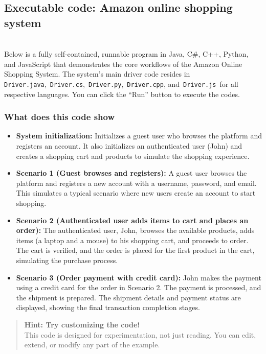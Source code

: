 \subsection{Executable code: Amazon online shopping system}\label{mcg2gLg9H3CiR7Ox5y7Ig}
\\
Below is a fully self-contained, runnable program in Java, C\#, C++, Python, and JavaScript that demonstrates the core workflows of the Amazon Online Shopping System. The system's main driver code resides in \texttt{Driver.java},~\texttt{Driver.cs},~\texttt{Driver.py},~\texttt{Driver.cpp}, and~\texttt{Driver.js}~for all respective languages. You can click the ``Run'' button to execute the codes.

\subsubsection{What does this code show}\label{P3iJfzgPuLN02tbkrblED}

\begin{itemize}
\item
\protect{}\label{FyQrEJX4QaUFdPLcIrze6}
\textbf{System initialization:} Initializes a guest user who browses the platform and registers an account. It also initializes an authenticated user (John) and creates a shopping cart and products to simulate the shopping experience.
\item
\protect{}\label{qPYj-qtTHhvu9YAUSn0vv}
\textbf{Scenario 1 (Guest browses and registers):} A guest user browses the platform and registers a new account with a username, password, and email. This simulates a typical scenario where new users create an account to start shopping.
\item
\protect{}\label{YmFHnOP6p2z1Uvw8965uu}
\textbf{Scenario 2 (Authenticated user adds items to cart and places an order):} The authenticated user, John, browses the available products, adds items (a laptop and a mouse) to his shopping cart, and proceeds to order. The cart is verified, and the order is placed for the first product in the cart, simulating the purchase process.
\item
\protect{}\label{j0VFEwPBoIv-Y4ZpSh8XG}
\textbf{Scenario 3 (Order payment with credit card):} John makes the payment using a credit card for the order in Scenario 2. The payment is processed, and the shipment is prepared. The shipment details and payment status are displayed, showing the final transaction completion stages.
\end{itemize}
\begin{quote}
\textbf{Hint: Try customizing the code!}\\
This code is designed for experimentation, not just reading. You can edit, extend, or modify any part of the example.
\end{quote}

